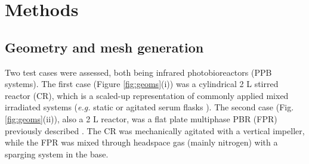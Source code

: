 



\section{Methods}
\label{sec:ch3_gov}
\subsection{Geometry and mesh generation}
\label{ssec:geom}
Two test cases were assessed, both being infrared photobioreactors (PPB systems). The first case (Figure \ref{fig:geoms}(i)) was a cylindrical 2 L stirred reactor (CR), which is a scaled-up representation of commonly applied mixed irradiated systems (\textit{e.g.} static or agitated serum flasks \cite{Hulsen2014}). The second case (Fig. \ref{fig:geoms}(ii)), also a 2 L reactor, was a flat plate multiphase PBR (FPR) previously described \cite{Hulsen2016, Hulsen2016a}. The CR was mechanically agitated with a vertical impeller, while the FPR was mixed through headspace gas (mainly nitrogen) with a sparging system in the base.

